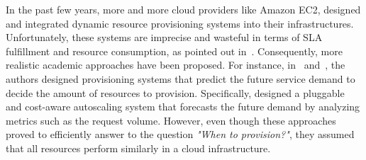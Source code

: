 


In the past few years, more and more cloud providers like Amazon EC2, designed and integrated dynamic resource provisioning systems into their infrastructures. Unfortunately, these systems are imprecise and wasteful in terms of SLA fulfillment and resource consumption, as pointed out in~\cite{ghanbari_exploring_2011}. Consequently, more realistic academic approaches have been proposed. For instance, in~\cite{ali-eldin_2012} and~\cite{bunch_2012}, the authors designed provisioning systems that predict the future service demand to decide the amount of resources to provision. Specifically, \cite{bunch_2012} designed a pluggable and cost-aware autoscaling system that forecasts the future demand by analyzing metrics such as the request volume. However, even though these approaches proved to efficiently answer to the question \emph{"When to provision?"}, they assumed that all resources perform similarly in a cloud infrastructure.

